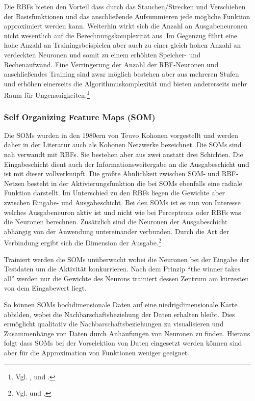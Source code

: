 Die RBFs bieten den Vorteil dass durch das Stauchen/Strecken und Verschieben der Basisfunktionen und das anschließende Aufsummieren jede mögliche Funktion approximiert werden kann. Weiterhin wirkt sich die Anzahl an Ausgabeneuronen nicht wesentlich auf die Berechnungskomplexität aus. Im Gegenzug führt eine hohe Anzahl an Trainingsbeispielen aber auch zu einer gleich hohen Anzahl an verdeckten Neuronen und somit zu einem erhöhten Speicher- und Rechenaufwand. Eine Verringerung der Anzahl der RBF-Neuronen und anschließendes Training sind zwar möglich bestehen aber aus mehreren Stufen und erhöhen einerseits die Algorithmuskomplexität und bieten andererseits mehr Raum für Ungenauigkeiten.\footnote{Vgl. \citet[73\,--\,81]{comp_int_07}, \citet[109\,--\,125]{dkriesel07} und \citet[261\,--\,271]{Kroll16}.}



\subsubsection{Self Organizing Feature Maps (SOM)}

Die SOMs wurden in den 1980ern von Teuvo Kohonen vorgestellt und werden daher in der Literatur auch als Kohonen Netzwerke bezeichnet. Die SOMs sind nah verwandt mit RBFs. Sie bestehen aber aus zwei anstatt drei Schichten. Die Eingabeschicht dient auch der Informationsweitergabe an die Ausgabeschicht und ist mit dieser vollverknüpft. Die größte Ähnlichkeit zwischen SOM- und RBF-Netzen besteht in der Aktivierungsfunktion die bei SOMs ebenfalls eine radiale Funktion darstellt. Im Unterschied zu den RBFs liegen die Gewichte aber zwischen Eingabe- und Ausgabeschicht. Bei den SOMs ist es nun von Interesse welches Ausgabeneuron aktiv ist und nicht wie bei Perceptrons oder RBFs was die Neuronen berechnen. Zusätzlich sind die Neuronen der Ausgabeschicht abhängig von der Anwendung untereinander verbunden. Durch die Art der Verbindung ergibt sich die Dimension der Ausgabe.\footnote{Vgl. \citet[102\,--\,104]{Kruse15} und \citet[153\,--\,156]{dkriesel07}.}

Trainiert werden die SOMs unüberwacht wobei die Neuronen bei der Eingabe der Testdaten um die Aktivität konkurrieren. Nach dem Prinzip ``the winner takes all'' werden nur die Gewichte des Neurons trainiert dessen Zentrum am kürzesten von dem Eingabewert liegt.

So können SOMs hochdimensionale Daten auf eine niedrigdimensionale Karte abbilden, wobei die Nachbarschaftsbeziehung der Daten erhalten bleibt. Dies ermöglicht qualitativ die Nachbarschaftsbeziehungen zu visualisieren und Zusammenhänge von Daten durch Anhäufungen von Neuronen zu finden. Hieraus folgt dass SOMs bei der Vorselektion von Daten eingesetzt werden können sind aber für die Approximation von Funktionen weniger geeignet.

